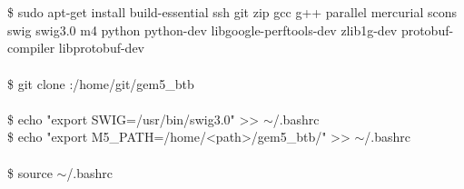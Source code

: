 \begin{center}
    \begin{tcolorbox}[width=\linewidth]
        \ttfamily
         \\
        
         \\
        \$ sudo apt-get install build-essential ssh git zip gcc g++ parallel mercurial scons swig swig3.0 m4 python python-dev libgoogle-perftools-dev zlib1g-dev protobuf-compiler libprotobuf-dev \\
        
        \\
        \$ git clone :/home/git/gem5\_btb \\
        
         \\
        \$ echo "export SWIG=/usr/bin/swig3.0" >{}> $\sim$/.bashrc \\
        \$ echo "export M5\_PATH=/home/<path>/gem5\_btb/" >{}> $\sim$/.bashrc \\
         \\
        \$ source $\sim$/.bashrc
    \end{tcolorbox}
\end{center}

